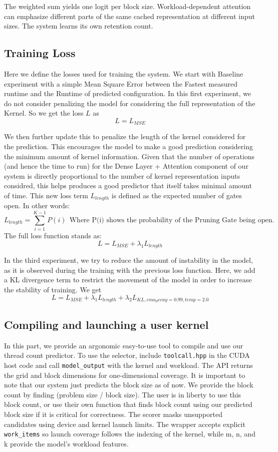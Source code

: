 \documentclass[11pt,letterpaper]{article}
\begin{document}
The weighted sum yields one logit per block size. Workload-dependent attention can emphasize different parts of the same cached
representation at different input sizes. The system learns its own retention count.


\subsection{Training Loss}
Here we define the losses used for training the system. We start with Baseline experiment with a simple Mean Square Error between 
the Fastest measured runtime and the Runtime of predicted configuration. In this first experiment, we do not consider penalizing the model
for considering the full representation of the Kernel. So we get the loss $L$ as
\[
L = L_{MSE}
\]

We then further update this to penalize the length of the kernel considered for the prediction. This encourages the model
to make a good prediction considering the minimum amount of kernel information. Given that the number of operations (and hence the time to run) for the Dense Layer + Attention component
of our system is directly proportional to the number of kernel representation inputs considred, this helps produces a good predictor that itself takes minimal amount of time.
This new loss term $L_{length}$ is defined as the expected number of gates open. In other words:
\[
L_{length} = \sum_{i=1}^{K - 1} P(i) ~~ \text{Where P(i) shows the probability of the Pruning Gate being open.}
\]
The full loss function stands as:
\[
L = L_{MSE} + \lambda_1 L_{length}
\]

In the third experiment, we try to reduce the amount of instability in the model, as it is observed during the training with the previous
loss function. Here, we add a KL divergence term to restrict the movement of the model in order to increase the stability of training.
We get
\[
L = L_{MSE} + \lambda_1 L_{length} + \lambda_2 L_{KL,ema_decay=0.99,temp=2.0}
\]


\subsection{Compiling and launching a user kernel}
In this part, we provide an argonomic easy-to-use tool to compile and use our thread count predictor.
To use the selector, include \texttt{toolcall.hpp} in the CUDA host code and call \texttt{model\_output}
with the kernel and workload. The API returns the grid and block dimensions for one-dimensional coverage. It is important to note that
our system just predicts the block size as of now. We provide the block count by finding (problem size / block size). The user is in 
liberty to use this block count, or use their own function that finds block count using our predicted block size if it is critical for correctness.
The scorer masks unsupported candidates using device and kernel launch limits. The wrapper accepts explicit
\texttt{work\_items} so launch coverage follows the indexing of the kernel, while m, n, and k provide the
model's workload features.
\end{document}
